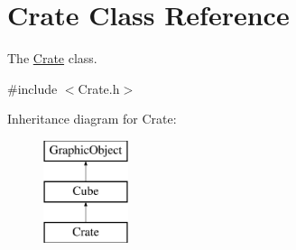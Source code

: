 \hypertarget{classCrate}{}\section{Crate Class Reference}
\label{classCrate}


The \hyperlink{classCrate}{Crate} class.  




{\ttfamily \#include $<$Crate.\+h$>$}

Inheritance diagram for Crate\+:\begin{figure}[H]
\begin{center}
\leavevmode
\includegraphics[height=3.000000cm]{classCrate}
\end{center}
\end{figure}
